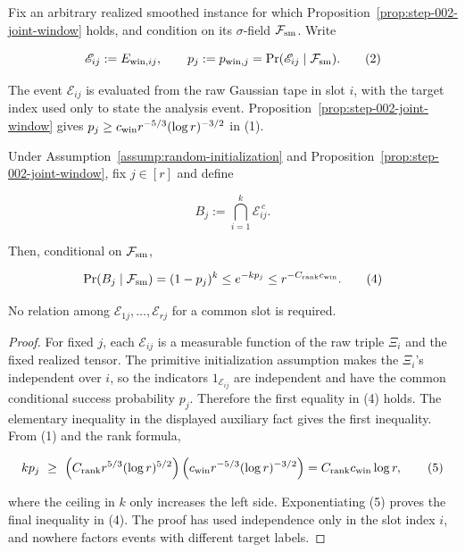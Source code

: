 Fix an arbitrary realized smoothed instance for which
Proposition~\ref{prop:step-002-joint-window} holds, and condition on its
$\sigma$-field $\mathcal F_{\rm sm}$. Write

\[
\mathscr E_{ij}:=E_{{\rm win},ij},\qquad
p_j:=p_{{\rm win},j}=\Pr(\mathscr E_{ij}\mid\mathcal F_{\rm sm}).
\tag{2}
\]

The event \(\mathscr E_{ij}\) is evaluated from the raw Gaussian tape in slot
\(i\), with the target index used only to state the analysis event.
Proposition~\ref{prop:step-002-joint-window} gives
\(p_j\ge c_{\rm win}r^{-5/3}(\log r)^{-3/2}\) in (1).


\begin{lemma}\label{lem:step-003-slot-miss}
Under Assumption~\ref{assump:random-initialization} and
Proposition~\ref{prop:step-002-joint-window}, fix \(j\in[r]\) and define

\[
B_j:=\bigcap_{i=1}^k\mathscr E_{ij}^{\,c}.
\tag{3}
\]

Then, conditional on \(\mathcal F_{\rm sm}\),

\[
\Pr(B_j\mid\mathcal F_{\rm sm})=(1-p_j)^k
\le e^{-kp_j}
\le r^{-C_{\rm rank}c_{\rm win}}.
\tag{4}
\]

No relation among \(\mathscr E_{1j},\ldots,\mathscr E_{rj}\) for a common
slot is required.

\begin{proof}
For fixed \(j\), each \(\mathscr E_{ij}\) is a measurable function of the
raw triple \(\Xi_i\) and the fixed realized tensor. The primitive
initialization assumption makes the \(\Xi_i\)'s independent over \(i\), so
the indicators \(1_{\mathscr E_{ij}}\) are independent and have the common
conditional success probability \(p_j\). Therefore the first equality in
(4) holds. The elementary inequality in the displayed auxiliary fact gives the first
inequality. From (1) and the rank formula,

\[
kp_j\ \ge\ \left(C_{\rm rank}r^{5/3}(\log r)^{5/2}\right)
   \left(c_{\rm win}r^{-5/3}(\log r)^{-3/2}\right)
 =C_{\rm rank}c_{\rm win}\log r,
\tag{5}
\]

where the ceiling in \(k\) only increases the left side. Exponentiating
(5) proves the final inequality in (4). The proof has used independence
only in the slot index \(i\), and nowhere factors events with different
target labels. 


\end{proof}
\end{lemma}
